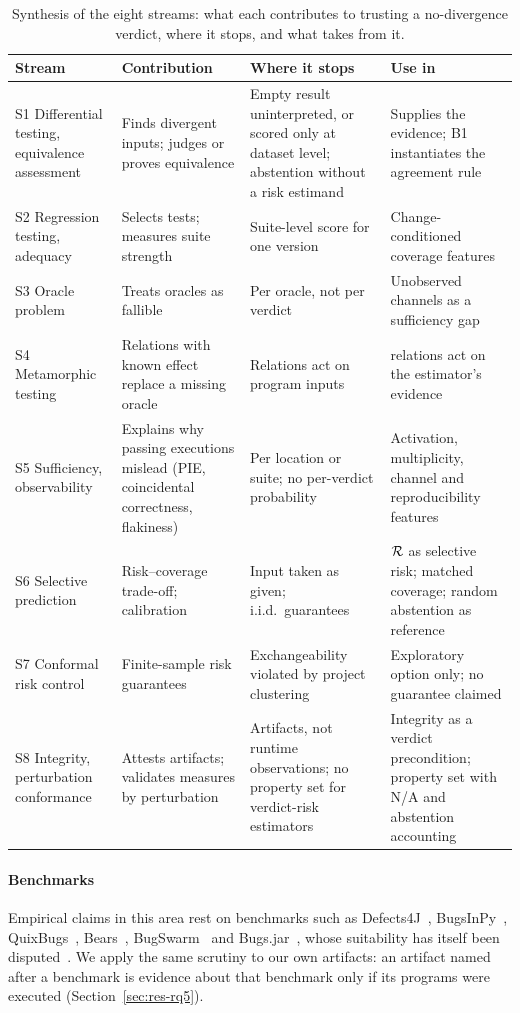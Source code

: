 \begin{table}[!t]
\caption{Synthesis of the eight streams: what each contributes to trusting a no-divergence verdict, where it stops, and what \sbg{} takes from it.}
\label{tab:synthesis}
\centering
\footnotesize
\setlength{\tabcolsep}{3pt}
\renewcommand{\arraystretch}{1.08}
\begin{tabular}{|L{2.6cm}|L{4.3cm}|L{4.6cm}|L{4.9cm}|}
\hline
Stream & Contribution & Where it stops & Use in \sbg{} \\
\hline
S1 Differential testing, equivalence assessment & Finds divergent inputs; judges or proves equivalence & Empty result uninterpreted, or scored only at dataset level; abstention without a risk estimand & Supplies the evidence; B1 instantiates the agreement rule \\
S2 Regression testing, adequacy & Selects tests; measures suite strength & Suite-level score for one version & Change-conditioned coverage features \\
S3 Oracle problem & Treats oracles as fallible & Per oracle, not per verdict & Unobserved channels as a sufficiency gap \\
S4 Metamorphic testing & Relations with known effect replace a missing oracle & Relations act on program inputs & \ers{} relations act on the estimator's evidence \\
S5 Sufficiency, observability & Explains why passing executions mislead (PIE, coincidental correctness, flakiness) & Per location or suite; no per-verdict probability & Activation, multiplicity, channel and reproducibility features \\
S6 Selective prediction & Risk--coverage trade-off; calibration & Input taken as given; i.i.d.\ guarantees & $\mathcal{R}$ as selective risk; matched coverage; random abstention as reference \\
S7 Conformal risk control & Finite-sample risk guarantees & Exchangeability violated by project clustering & Exploratory option only; no guarantee claimed \\
S8 Integrity, perturbation conformance & Attests artifacts; validates measures by perturbation & Artifacts, not runtime observations; no property set for verdict-risk estimators & Integrity as a verdict precondition; \ers{} property set with N/A and abstention accounting \\
\hline
\end{tabular}
\end{table}

\paragraph*{Benchmarks} Empirical claims in this area rest on benchmarks such as Defects4J~\cite{just2014defects4j}, BugsInPy~\cite{widyasari2020bugsinpy}, QuixBugs~\cite{lin2017quixbugs}, Bears~\cite{madeiral2019bears}, BugSwarm~\cite{tomassi2019bugswarm} and Bugs.jar~\cite{saha2018bugsjar}, whose suitability has itself been disputed~\cite{durieux2019critical,tomassi2019note}. We apply the same scrutiny to our own artifacts: an artifact named after a benchmark is evidence about that benchmark only if its programs were executed (Section~\ref{sec:res-rq5}).
